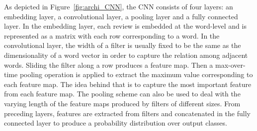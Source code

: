 \documentclass[conference,compsoc]{IEEEtran}
\begin{document}
As depicted in Figure~\ref{fig:archi_CNN}, the CNN consists of four layers: an embedding layer, a convolutional layer, a pooling layer and a fully connected layer. In the embedding layer, each review is embedded at the word-level and is represented as a matrix with each row corresponding to a word. In the convolutional layer, the width of a filter is usually fixed to be the same as the dimensionality of a word vector in order to capture the relation among adjacent words.
Sliding the filter along a row produces a feature map. Then a max-over-time pooling operation is applied to extract the maximum value corresponding to each feature map. The idea behind that is to capture the most important feature from each feature map. The pooling scheme can also be used to deal with the varying length of the feature maps produced by filters of different sizes. From preceding layers, features are extracted from filters and concatenated in the fully connected layer to produce a probability distribution over output classes. 
\end{document}
